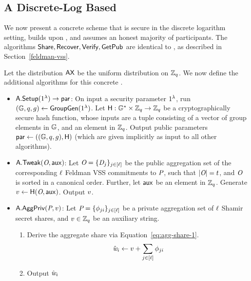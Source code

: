 \subsection{A Discrete-Log Based \AVSS} \label{avss:concrete}
We now present a concrete \AVSS scheme that is secure in the discrete logarithm
setting,
builds upon \FeldVariant, and assumes an honest majority of participants.
The algorithms $\mathsf{Share}, \mathsf{Recover}, \mathsf{Verify}, \mathsf{GetPub}$ are identical to \FeldVariant,
as described in Section~\ref{feldman-vss}.

Let the distribution $\mathsf{AX}$ be the uniform distribution on $\mathbb{Z}_q$.
We now define the additional algorithms for this concrete \AVSS.

\begin{itemize}
    \item $\mathsf{A}.\mathsf{Setup}(1^\lambda) \rightarrow \mathsf{par}$:
    On input a security parameter $1^\lambda$,
    run $(\mathbb{G}, q, g) \gets \mathsf{GroupGen}(1^{\lambda})$.
    Let $\mathsf{H}: \mathbb{G}^* \times \mathbb{Z}_q \rightarrow \mathbb{Z}_q$ be a cryptographically secure hash function,
    whose inputs are a tuple consisting of a vector of group elements in $\mathbb{G}$, and an element in $\mathbb{Z}_q$.
    Output public parameters $\mathsf{par} \gets ((\mathbb{G}, q, g), \mathsf{H})$ (which are given implicitly as input to all other algorithms).
  \item[-] $\mathsf{A}.\mathsf{Tweak}(\textit{O}, \mathsf{aux})$:
    Let $\textit{O} = \{ \textit{D}_j \}_{j \in [\mathsf{\ell}]}$
    be the public aggregation set of the corresponding $\mathsf{\ell}$ Feldman VSS commitments to $\textit{P}$,
    such that $\lvert \textit{O} \rvert = t$,
    and $\textit{O}$ is sorted in a canonical order.
    Further, let $\mathsf{aux}$ be an element in $\mathbb{Z}_q$.
    Generate $v \gets \mathsf{H}(\textit{O}, \mathsf{aux})$.
    Output $v$.
  \item[-] $\mathsf{A}.\mathsf{AggPriv}(\textit{P},v)$:
      Let $\textit{P} = \{ \phi_{ji} \}_{j \in [\mathsf{\ell}]}$ be a private aggregation set of $\mathsf{\ell}$ Shamir secret shares,
      and $v \in \mathbb{Z}_q$ be an auxiliary string.
    \begin{enumerate}
    \item Derive the aggregate share via Equation~\ref{eq:agg-share-1}.
        \begin{equation} \label{eq:agg-share-1}
          \hat{\textit{w}}_i \gets v + \sum_{j \in [\mathsf{\ell}]} \phi_{ji}
        \end{equation}
    \item Output $\hat{\textit{w}}_i$
    \end{enumerate}


\end{itemize}
